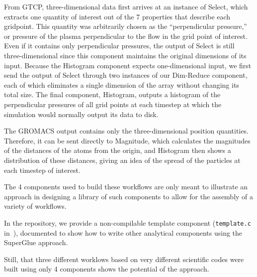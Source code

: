 From GTCP, three-dimensional data first
arrives at an instance of Select, which extracts
one quantity of interest out of the 7 properties that describe each gridpoint.
This quantity was arbitrarily chosen as the ``perpendicular
pressure,'' or pressure of the plasma perpendicular to the flow in the grid
point of interest. Even if it contains only perpendicular pressures, the output
of Select is still three-dimensional since this component maintains the
original dimensions of its input. Because the Histogram component expects
one-dimensional input, we first send the output of Select through two instances
of our Dim-Reduce component, each of which eliminates a single dimension of the
array without changing its total size. The final component, Histogram, outputs
a histogram of the perpendicular pressures of all grid points at each timestep
at which the simulation would normally output its data to disk.

The GROMACS output
contains only the three-dimensional
position quantities.
Therefore, it can be sent directly to
Magnitude, which calculates
the magnitudes of the distances of the atoms from
the origin, and Histogram then shows a distribution
of these distances, giving an idea of the spread
of the particles at each timestep of interest.

The 4 components used to build these workflows
are only meant to illustrate an approach
in designing a library of such components
to allow for the assembly of a variety of workflows.

In the repository, we provide a non-compilable
template component
(\verb|template.c| in~\cite{champsaur:superglue-repo}),
documented to show
how to write other analytical
components using the SuperGlue approach.

Still, that three different worklows based
on very different scientific codes were built using
only 4 components shows the potential of the approach.
